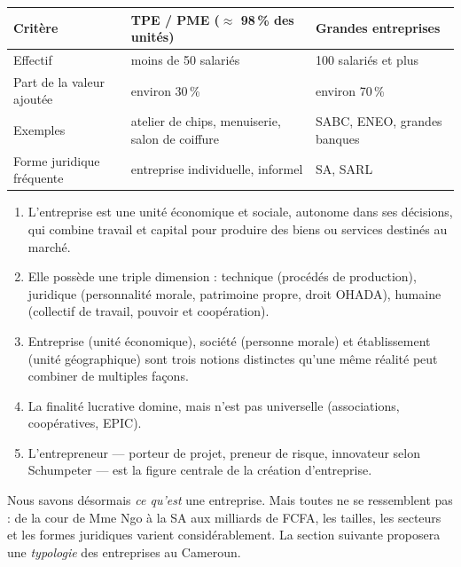 \documentclass[11pt]{article}
\newcounter{popsec}
\newcounter{popsub}
\newcommand{\courssub}[1]{%
  \stepcounter{popsub}%
  \par\vspace{9pt}\noindent{\popxbold\fontsize{11.5}{13}\selectfont\color{popink}{\color{poporange}\thepopsec.\thepopsub}\hspace{6pt}#1}\par\nopagebreak\vspace{4pt}
}
\begin{document}
\begin{center}
\begin{tabularx}{\linewidth}{|l|X|X|}
\hline
\rowcolor{popblueL} \textbf{Critère} & \textbf{TPE / PME ($\approx$ 98\,\% des unités)} & \textbf{Grandes entreprises} \\
\hline
Effectif & moins de 50 salariés & 100 salariés et plus \\
\hline
Part de la valeur ajoutée & environ 30\,\% & environ 70\,\% \\
\hline
Exemples & atelier de chips, menuiserie, salon de coiffure & SABC, ENEO, grandes banques \\
\hline
Forme juridique fréquente & entreprise individuelle, informel & SA, SARL \\
\hline
\end{tabularx}
\end{center}

\courssub{Synthèse et ouverture}

\begin{aretenir}
\begin{enumerate}
\item L'entreprise est une unité économique et sociale, autonome dans ses décisions, qui combine travail et capital pour produire des biens ou services destinés au marché.
\item Elle possède une triple dimension : technique (procédés de production), juridique (personnalité morale, patrimoine propre, droit OHADA), humaine (collectif de travail, pouvoir et coopération).
\item Entreprise (unité économique), société (personne morale) et établissement (unité géographique) sont trois notions distinctes qu'une même réalité peut combiner de multiples façons.
\item La finalité lucrative domine, mais n'est pas universelle (associations, coopératives, EPIC).
\item L'entrepreneur — porteur de projet, preneur de risque, innovateur selon Schumpeter — est la figure centrale de la création d'entreprise.
\end{enumerate}
\end{aretenir}

Nous savons désormais \emph{ce qu'est} une entreprise. Mais toutes ne se ressemblent pas : de la cour de Mme Ngo à la SA aux milliards de FCFA, les tailles, les secteurs et les formes juridiques varient considérablement. La section suivante proposera une \emph{typologie} des entreprises au Cameroun.
\end{document}

